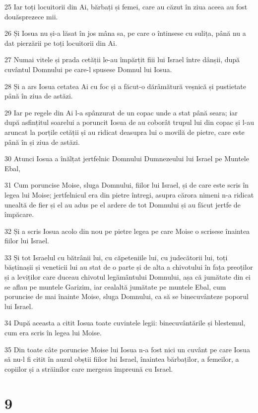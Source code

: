 \par 25 Iar toți locuitorii din Ai, bărbați și femei, care au căzut în ziua aceea au fost douăsprezece mii.
\par 26 Și Iosua nu și-a lăsat în jos mâna sa, pe care o întinsese cu sulița, până nu a dat pierzării pe toți locuitorii din Ai.
\par 27 Numai vitele și prada cetății le-au împărțit fiii lui Israel între dânșii, după cuvântul Domnului pe care-l spusese Domnul lui Iosua.
\par 28 Și a ars Iosua cetatea Ai cu foc și a făcut-o dărâmătură veșnică și pustietate până în ziua de astăzi.
\par 29 Iar pe regele din Ai l-a spânzurat de un copac unde a stat până seara; iar după asfințitul soarelui a poruncit Iosua de au coborât trupul lui din copac și l-au aruncat la porțile cetății și au ridicat deasupra lui o movilă de pietre, care este până în și ziua de astăzi.
\par 30 Atunci Iosua a înălțat jertfelnic Domnului Dumnezeului lui Israel pe Muntele Ebal,
\par 31 Cum poruncise Moise, sluga Domnului, fiilor lui Israel, și de care este scris în legea lui Moise; jertfelnicul era din pietre întregi, asupra cărora nimeni n-a ridicat unealtă de fier și el au adus pe el ardere de tot Domnului și au făcut jertfe de împăcare.
\par 32 Și a scris Iosua acolo din nou pe pietre legea pe care Moise o scrisese înaintea fiilor lui Israel.
\par 33 Și tot Israelul cu bătrânii lui, cu căpeteniile lui, cu judecătorii lui, toți băștinașii și veneticii lui au stat de o parte și de alta a chivotului în fața preoților și a leviților care duceau chivotul legământului Domnului, așa că jumătate din ei se aflau pe muntele Garizim, iar cealaltă jumătate pe muntele Ebal, cum poruncise de mai înainte Moise, sluga Domnului, ca să se binecuvânteze poporul lui Israel.
\par 34 După aceasta a citit Iosua toate cuvintele legii: binecuvântările și blestemul, cum era scris în legea lui Moise.
\par 35 Din toate câte poruncise Moise lui Iosua n-a fost nici un cuvânt pe care Iosua să nu-l fi citit în auzul obștii fiilor lui Israel, înaintea bărbaților, a femeilor, a copiilor și a străinilor care mergeau împreună cu Israel.

\chapter{9}

